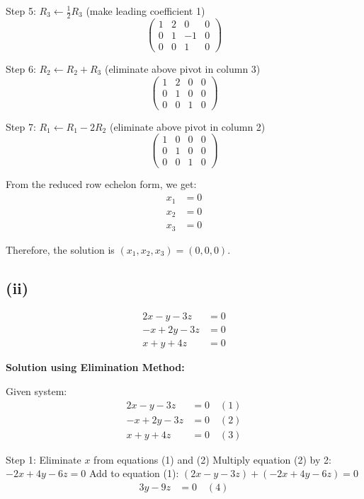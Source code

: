 \documentclass[12pt]{article}
\begin{document}
Step 5: $R_3 \leftarrow \frac{1}{2}R_3$ (make leading coefficient 1)
\[
\left(\begin{array}{ccc|c}
1 & 2 & 0 & 0\\
0 & 1 & -1 & 0\\
0 & 0 & 1 & 0
\end{array}\right)
\]

Step 6: $R_2 \leftarrow R_2 + R_3$ (eliminate above pivot in column 3)
\[
\left(\begin{array}{ccc|c}
1 & 2 & 0 & 0\\
0 & 1 & 0 & 0\\
0 & 0 & 1 & 0
\end{array}\right)
\]

Step 7: $R_1 \leftarrow R_1 - 2R_2$ (eliminate above pivot in column 2)
\[
\left(\begin{array}{ccc|c}
1 & 0 & 0 & 0\\
0 & 1 & 0 & 0\\
0 & 0 & 1 & 0
\end{array}\right)
\]

From the reduced row echelon form, we get:
\begin{align*}
x_1 &= 0\\
x_2 &= 0\\
x_3 &= 0
\end{align*}

Therefore, the solution is $\boxed{(x_1, x_2, x_3) = (0, 0, 0)}$.

\subsection*{(ii)}
\begin{align*}
2x - y - 3z &= 0\\
-x + 2y - 3z &= 0\\
x + y + 4z &= 0
\end{align*}

\textbf{Solution using Elimination Method:}

Given system:
\begin{align}
2x - y - 3z &= 0 \quad (1)\\
-x + 2y - 3z &= 0 \quad (2)\\
x + y + 4z &= 0 \quad (3)
\end{align}

Step 1: Eliminate $x$ from equations (1) and (2)
Multiply equation (2) by 2: $-2x + 4y - 6z = 0$
Add to equation (1): $(2x - y - 3z) + (-2x + 4y - 6z) = 0$
\begin{align}
3y - 9z &= 0 \quad (4)
\end{align}
\end{document}
